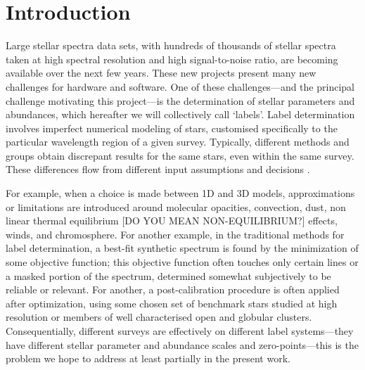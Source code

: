 \documentclass[12pt, preprint]{aastex}
\begin{document}

\section{Introduction}

Large stellar spectra data sets, with hundreds of thousands of stellar spectra taken at high spectral resolution and high signal-to-noise ratio, are becoming available over the next few years.  These new projects present many new challenges for hardware and software.  One of these challenges---and the principal challenge motivating this project---is the determination of stellar parameters and abundances, which hereafter we will collectively call `labels'.  Label determination involves imperfect numerical modeling of stars, customised specifically to the particular wavelength region of a given survey. Typically, different methods and groups obtain discrepant results for the same stars, even within the same survey.  These differences flow from different input assumptions and decisions \citep[e.g.]{Sm2014}.

For example, when a choice is made between 1D and 3D models, approximations or limitations are introduced around molecular opacities, convection, dust, non linear thermal equilibrium [DO YOU MEAN NON-EQUILIBRIUM?] effects, winds, and chromosphere.  For another example, in the traditional methods for label determination, a best-fit synthetic spectrum is found by the minimization of some objective function; this objective function often touches only certain lines or a masked portion of the spectrum, determined somewhat subjectively to be reliable or relevant.  For another, a post-calibration procedure is often applied after optimization, using some chosen set of benchmark stars studied at high resolution or members of well characterised open and globular clusters.  Consequentially, different surveys are effectively on different label systems---they have different stellar parameter and abundance scales and zero-points---this is the problem we hope to address at least partially in the present work.
\end{document}

